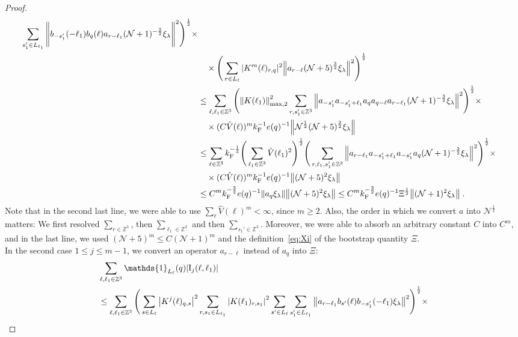 \documentclass[12pt,a4paper]{article}
\numberwithin{equation}{section}
\newcommand{\cN}{\mathcal{N}}
\newcommand{\1}{\mathbb{I}}
\newcommand{\F}{\mathrm{F}}
\newcommand{\I}{\mathrm{I}}
\newcommand{\Zstar}{\mathbb{Z}^3} %
\newcommand{\Z}{\mathbb{Z}}
\newcommand{\NN}{\mathcal{N}}
\newcommand{\half}{\frac{1}{2}}
\theoremstyle{plain}
\theoremstyle{definition}
\theoremstyle{remark}
\theoremstyle{plain}
\theoremstyle{definition}
\theoremstyle{remark}
\begin{document}
\begin{proof}
\begin{align}
		\sum_{s_1' \in L_{\ell_1}} \Bigg\Vert b_{-s_1'}(-\ell_1) b_{q}(\ell) a_{r-\ell_1} (\NN+1)^{-\frac 32}\xi_\lambda \Bigg\Vert^2\Bigg)^\half \times\nonumber\\
	&\quad \times \Bigg( \sum\limits_{r \in L_\ell} |K^{m}(\ell)_{r,q}|^2 \norm{ a_{r-\ell} (\NN+5)^{\frac 32}\xi_\lambda }^2\Bigg)^\half \nonumber\\
	&\leq \sum_{\ell,\ell_1 \in \Zstar} \Bigg( \norm{K(\ell_1)}_{\max,2}^2 \sum\limits_{r, s_1' \in \Z^3} \norm{ a_{-s_1'} a_{-s_1' + \ell_1} a_q a_{q-\ell} a_{r-\ell_1} (\NN+1)^{-\frac 32}\xi_\lambda}^2\Bigg)^\half \times\nonumber\\
	& \quad \times (C \hat{V}(\ell))^m k_{\F}^{-1} e(q)^{-1} \norm{ \NN^\half(\NN+5)^{\frac 32}\xi_\lambda } \nonumber\\
	&\leq \sum_{\ell \in \Zstar} k_{\F}^{-\half} \Bigg( \sum_{\ell_1 \in \Zstar} \hat{V}(\ell_1)^2 \Bigg)^{\half}
		\Bigg( \sum_{r,\ell_1,s_1' \in \Z^3}
		\norm{ a_{r-\ell_1} a_{-s_1'+\ell_1} a_{-s_1'} a_q  (\NN+1)^{-\frac 32}\xi_\lambda}^2\Bigg)^\half \times\nonumber\\
	& \quad \times (C \hat{V}(\ell))^m k_{\F}^{-1} e(q)^{-1} \norm{ (\NN+5)^2 \xi_\lambda } \nonumber\\
	&\leq C^m k_{\F}^{-\frac 32} e(q)^{-1}
		\norm{ a_q \xi_\lambda} \norm{(\NN+5)^2 \xi_\lambda}
	\leq C^m k_{\F}^{-\frac 32} e(q)^{-1} \Xi^\half
	 	\norm { (\NN+1)^2 \xi_\lambda } \;.\label{eq:estEQ1111}
\end{align}
Note that in the second last line, we were able to use $ \sum_\ell \hat{V}(\ell)^m < \infty $, since $ m \ge 2 $.
Also, the order in which we convert $ a $ into $ \cN^\half $ matters: We first resolved $ \sum_{r \in \Z^3} $, then $ \sum_{\ell_1 \in \Z^3} $  and then $ \sum_{s_1' \in \Z^3} $.
Moreover, we were able to absorb an arbitrary constant $ C $ into $ C^m $, and in the last line, we used $ (\cN+5)^m \le C (\cN+1)^m $ and the definition~\eqref{eq:Xi} of the bootstrap quantity $ \Xi $.\\
In the second case $ 1 \le j \le m-1 $, we convert an operator $ a_{r-\ell} $ instead of $ a_q $ into $ \Xi $:
\begin{align}
	&\sum_{\ell,\ell_1 \in \Zstar} \mathds{1}_{L_\ell}(q) |\I_j(\ell, \ell_1)| \nonumber\\
	&\leq \sum_{\ell,\ell_1 \in \Zstar} \Bigg( \sum\limits_{s \in L_\ell} \abs{K^j(\ell)_{q,s}}^2
		\sum\limits_{r, s_1 \in L_{\ell_1}} \abs{K(\ell_1)_{r,s_1}}^2
		\sum\limits_{s' \in L_\ell} \sum\limits_{s_1' \in L_{\ell_1}} \norm{a_{r-\ell_1} b_{s'}(\ell) b_{-s_1'}(-\ell_1) \xi_\lambda}^2 \Bigg)^\half \times \nonumber\\

\end{align}
\end{proof}
\end{document}

